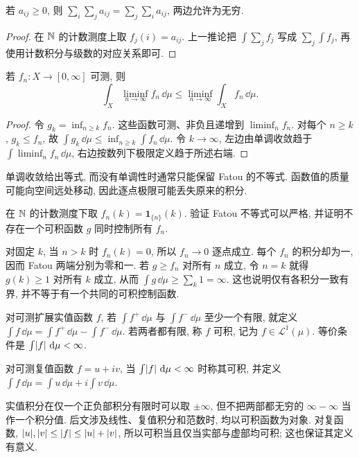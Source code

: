 \begin{corollary}\label{ra:c2:nonnegative-series}
若 $a_{ij}\ge0$, 则 $\sum_i\sum_j a_{ij}=\sum_j\sum_i a_{ij}$, 两边允许为无穷.
\end{corollary}
\begin{proof}
在 $\mathbb N$ 的计数测度上取 $f_j(i)=a_{ij}$. 上一推论把 $\int\sum_jf_j$ 写成 $\sum_j\int f_j$, 再使用计数积分与级数的对应关系即可.
\end{proof}

\begin{lemma}[Fatou]\label{ra:c2:fatou}
若 $f_n:X\to[0,\infty]$ 可测, 则
\[
 \int_X\liminf_{n\to\infty}f_n\,\dd\mu
 \le\liminf_{n\to\infty}\int_Xf_n\,\dd\mu.
\]
\end{lemma}
\begin{proof}
令 $g_k=\inf_{n\ge k}f_n$. 这些函数可测、非负且递增到 $\liminf_n f_n$. 对每个 $n\ge k$, $g_k\le f_n$, 故 $\int g_k\,\dd\mu\le\inf_{n\ge k}\int f_n\,\dd\mu$. 令 $k\to\infty$, 左边由单调收敛趋于 $\int\liminf_n f_n\,\dd\mu$, 右边按数列下极限定义趋于所述右端.
\end{proof}
单调收敛给出等式, 而没有单调性时通常只能保留 Fatou 的不等式. 函数值的质量可能向空间远处移动, 因此逐点极限可能丢失原来的积分.

\begin{example}
在 $\mathbb N$ 的计数测度下取 $f_n(k)=\mathbf1_{\{n\}}(k)$. 验证 Fatou 不等式可以严格, 并证明不存在一个可积函数 $g$ 同时控制所有 $f_n$.
\end{example}
\begin{solution}
对固定 $k$, 当 $n>k$ 时 $f_n(k)=0$, 所以 $f_n\to0$ 逐点成立. 每个 $f_n$ 的积分却为一, 因而 Fatou 两端分别为零和一. 若 $g\ge f_n$ 对所有 $n$ 成立, 令 $n=k$ 就得 $g(k)\ge1$ 对所有 $k$ 成立, 从而 $\int g\,\dd\mu\ge\sum_k1=\infty$. 这也说明仅有各积分一致有界, 并不等于有一个共同的可积控制函数.
\end{solution}

\begin{definition}\label{ra:c2:l1-definition}
对可测扩展实值函数 $f$, 若 $\int f^+\,\dd\mu$ 与 $\int f^-\,\dd\mu$ 至少一个有限, 就定义 $\int f\,\dd\mu=\int f^+\,\dd\mu-\int f^-\,\dd\mu$. 若两者都有限, 称 $f$ 可积, 记为 $f\in\mathcal L^1(\mu)$. 等价条件是 $\int\lvert f\rvert\,\,\mathrm d\mu<\infty$.

对可测复值函数 $f=u+iv$, 当 $\int\lvert f\rvert\,\,\mathrm d\mu<\infty$ 时称其可积, 并定义 $\int f\,\dd\mu=\int u\,\dd\mu+i\int v\,\dd\mu$.
\end{definition}
实值积分在仅一个正负部积分有限时可以取 $\pm\infty$, 但不把两部都无穷的 $\infty-\infty$ 当作一个积分值. 后文涉及线性、复值积分和范数时, 均以可积函数为对象. 对复函数, $\lvert u\rvert,\lvert v\rvert\le\lvert f\rvert\le\lvert u\rvert+\lvert v\rvert$, 所以可积当且仅当实部与虚部均可积; 这也保证其定义有意义.

